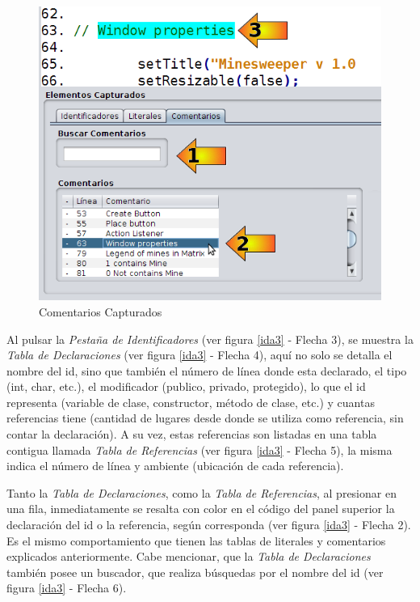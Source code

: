 \begin{figure}[t] %
\centerline{%
\includegraphics[scale= 0.55]{./cap4/ida_05.png}
}
\caption{Comentarios Capturados}
\label{ida5}
\end{figure}

Al pulsar la \textit{Pestaña de Identificadores} (ver figura \ref{ida3} - Flecha 3), se muestra la \textit{Tabla de Declaraciones} (ver figura \ref{ida3} - Flecha 4), aquí no solo se detalla el nombre del id, sino que también el número de línea donde esta declarado, el tipo (int, char, etc.), el modificador (publico, privado, protegido), lo que el id representa (variable de clase, constructor, método de clase, etc.) y cuantas referencias tiene (cantidad de lugares desde donde se utiliza como referencia, sin contar la declaración). A su vez, estas referencias son listadas en una tabla contigua llamada \textit{Tabla de Referencias} (ver figura \ref{ida3} - Flecha 5), la misma indica el número de línea y ambiente (ubicación de cada referencia). 

Tanto la \textit{Tabla de Declaraciones}, como la \textit{Tabla de Referencias}, al presionar en una fila, inmediatamente se resalta con color en el código del panel superior la declaración del id o la referencia, según corresponda (ver figura \ref{ida3} - Flecha 2). Es el mismo comportamiento que tienen las tablas de literales y comentarios explicados anteriormente. Cabe mencionar, que la \textit{Tabla de Declaraciones} también posee un buscador, que realiza búsquedas por el nombre del id (ver figura \ref{ida3} - Flecha 6).

